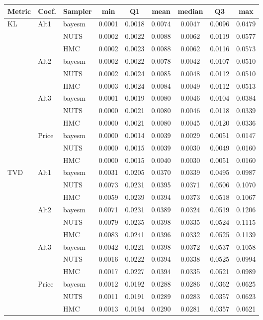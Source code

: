 \begin{tabular}{lllcccccc}
\toprule
Metric & Coef. & Sampler & min & Q1 & mean & median & Q3 & max \\
\midrule
KL & Alt1 & bayesm & 0.0001 & 0.0018 & 0.0074 & 0.0047 & 0.0096 & 0.0479 \\
 &  & NUTS & 0.0002 & 0.0022 & 0.0088 & 0.0062 & 0.0119 & 0.0577 \\
 &  & HMC & 0.0002 & 0.0023 & 0.0088 & 0.0062 & 0.0116 & 0.0573 \\
 & Alt2 & bayesm & 0.0002 & 0.0022 & 0.0078 & 0.0042 & 0.0107 & 0.0510 \\
 &  & NUTS & 0.0002 & 0.0024 & 0.0085 & 0.0048 & 0.0112 & 0.0510 \\
 &  & HMC & 0.0003 & 0.0024 & 0.0084 & 0.0049 & 0.0112 & 0.0513 \\
 & Alt3 & bayesm & 0.0001 & 0.0019 & 0.0080 & 0.0046 & 0.0104 & 0.0384 \\
 &  & NUTS & 0.0000 & 0.0021 & 0.0080 & 0.0046 & 0.0118 & 0.0339 \\
 &  & HMC & 0.0000 & 0.0021 & 0.0080 & 0.0045 & 0.0120 & 0.0336 \\
 & Price & bayesm & 0.0000 & 0.0014 & 0.0039 & 0.0029 & 0.0051 & 0.0147 \\
 &  & NUTS & 0.0000 & 0.0015 & 0.0039 & 0.0030 & 0.0049 & 0.0160 \\
 &  & HMC & 0.0000 & 0.0015 & 0.0040 & 0.0030 & 0.0051 & 0.0160 \\
TVD & Alt1 & bayesm & 0.0031 & 0.0205 & 0.0370 & 0.0339 & 0.0495 & 0.0987 \\
 &  & NUTS & 0.0073 & 0.0231 & 0.0395 & 0.0371 & 0.0506 & 0.1070 \\
 &  & HMC & 0.0059 & 0.0239 & 0.0394 & 0.0373 & 0.0518 & 0.1067 \\
 & Alt2 & bayesm & 0.0071 & 0.0231 & 0.0389 & 0.0324 & 0.0519 & 0.1206 \\
 &  & NUTS & 0.0079 & 0.0235 & 0.0398 & 0.0335 & 0.0524 & 0.1115 \\
 &  & HMC & 0.0083 & 0.0241 & 0.0396 & 0.0332 & 0.0525 & 0.1139 \\
 & Alt3 & bayesm & 0.0042 & 0.0221 & 0.0398 & 0.0372 & 0.0537 & 0.1058 \\
 &  & NUTS & 0.0016 & 0.0222 & 0.0394 & 0.0338 & 0.0525 & 0.0994 \\
 &  & HMC & 0.0017 & 0.0227 & 0.0394 & 0.0335 & 0.0521 & 0.0989 \\
 & Price & bayesm & 0.0012 & 0.0192 & 0.0288 & 0.0286 & 0.0362 & 0.0625 \\
 &  & NUTS & 0.0011 & 0.0191 & 0.0289 & 0.0283 & 0.0357 & 0.0623 \\
 &  & HMC & 0.0013 & 0.0194 & 0.0290 & 0.0281 & 0.0357 & 0.0621 \\
\bottomrule
\end{tabular}
